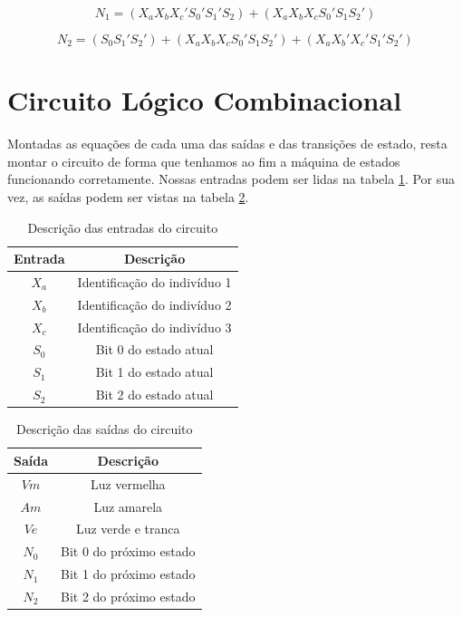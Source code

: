 \documentclass[12pt,a4paper]{article}
\begin{document}
\begin{equation}
N_1=(X_aX_bX_c'S_0'S_1'S_2)+(X_aX_bX_cS_0'S_1S_2')
\end{equation}

\begin{equation}
N_2=(S_0S_1'S_2')+(X_aX_bX_cS_0'S_1S_2')+(X_aX_b'X_c'S_1'S_2')
\end{equation}

\section{Circuito Lógico Combinacional}

Montadas as equações de cada uma das saídas e das transições de estado, resta montar o circuito de forma que tenhamos ao fim a máquina de estados funcionando corretamente. Nossas entradas podem ser lidas na tabela \ref{tab4}. Por sua vez, as saídas podem ser vistas na tabela \ref{tab5}.

\begin{table}[h]
\begin{center}
\begin{tabular}{c|c}
\textbf{Entrada} & \textbf{Descrição} \\ \hline
$X_a$ & Identificação do indivíduo 1 \\
$X_b$ & Identificação do indivíduo 2 \\
$X_c$ & Identificação do indivíduo 3 \\
$S_0$ & Bit 0 do estado atual \\
$S_1$ & Bit 1 do estado atual \\
$S_2$ & Bit 2 do estado atual \\
\end{tabular}
\end{center}
\caption{Descrição das entradas do circuito}
\label{tab4}
\end{table}

\begin{table}[h]
\begin{center}
\begin{tabular}{c|c}
\textbf{Saída} & \textbf{Descrição} \\ \hline
$Vm$ & Luz vermelha \\
$Am$ & Luz amarela \\
$Ve$ & Luz verde e tranca \\
$N_0$ & Bit 0 do próximo estado \\
$N_1$ & Bit 1 do próximo estado \\
$N_2$ & Bit 2 do próximo estado \\
\end{tabular}
\end{center}
\caption{Descrição das saídas do circuito}
\label{tab5}
\end{table}
\end{document}
